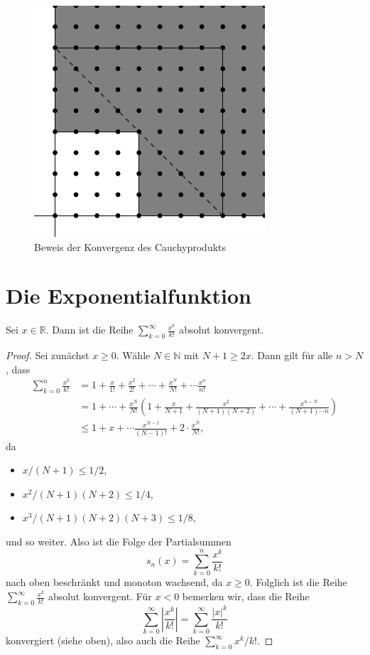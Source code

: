 \documentclass[../main.tex]{subfiles}
\begin{document}
\begin{figure}[htb]
  \centering
  \includegraphics{chapter2/images/cauchy-thm}
  \caption{Beweis der Konvergenz des Cauchyprodukts}%
  \label{fig:cauchy-proof}
\end{figure}

\section{Die Exponentialfunktion}
\begin{lemma*}
  Sei $x \in \mathbb{R}$. Dann ist die Reihe
  $\sum_{k=0}^{\infty} \frac{x^k}{k!}$ absolut konvergent.
\end{lemma*}

\begin{proof}
  Sei zunächst $x \geq 0$. Wähle $N \in \mathbb{N}$ mit
  $N+ 1 \geq 2x$.
  Dann gilt für alle $n > N$, dass
  \begin{align*}
    \sum_{k=0}^{n} \frac{x^k}{k!}    & 
    = 1 + \frac{x}{1!} + \frac{x^2}{2!} + \cdots
    + \frac{x^N}{N!} + \cdots \frac{x^n}{n!} \\ &
    = 1 + \cdots + \frac{x^N}{N!}
    \left( 1 + \frac{x}{N+1} + \frac{x^2}{(N+1)(N+2)}
  + \cdots + \frac{x^{n-N}}{(N+1) \cdots n}\right)\\ &
    \leq 1 + x + \cdots \frac{x^{N-1}}{(N-1)!} + 2 \cdot
    \frac{x^N}{N!},
  \end{align*}
  da
  \begin{itemize}
    \item $x/(N+1) \leq 1/2$,
    \item $x^2/(N+1)(N+2) \leq 1/4$,
    \item $x^3/(N+1)(N+2)(N+3) \leq 1/8$,
  \end{itemize}
  und so weiter.
  Also ist die Folge der Partialsummen
  \[
    s_n(x) = \sum_{k=0}^{n} \frac{x^k}{k!}
  \]
  nach oben beschränkt und monoton wachsend, da $x \geq 0$.
  Folglich ist die Reihe
  $\sum_{k=0}^{\infty} \frac{x^k}{k!}$ absolut konvergent.
  Für $x < 0$ bemerken wir,
  dass die Reihe
  \[
    \sum_{k=0}^{\infty} \left| \frac{x^k}{k!} \right|
    = \sum_{k=0}^{\infty} \frac{|x|^k}{k!}
  \]
  konvergiert (siehe oben), also auch die Reihe
  $\sum_{k=0}^{\infty} x^k/k!$.
\end{proof}
\end{document}
